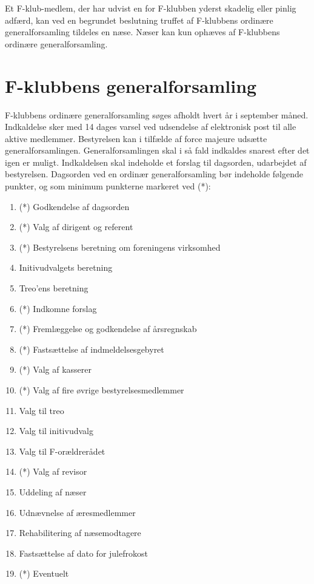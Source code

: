 \documentclass[a4paper,12pt,danish]{article}
\begin{document}
\begin{list}
\item Et F-klub-medlem, der har udvist en for F-klubben yderst
  skadelig eller pinlig adfærd, kan ved en begrundet beslutning
  truffet af F-klubbens ordinære generalforsamling tildeles en
  næse.  Næser kan kun ophæves af F-klubbens ordinære
  generalforsamling.

\section{F-klubbens generalforsamling}

\item \label{par-gen} F-klubbens ordinære generalforsamling
  søges afholdt hvert år i september måned. Indkaldelse sker med 14
  dages varsel ved udsendelse af elektronisk post til alle aktive
  medlemmer. Bestyrelsen kan i tilfælde af force majeure udsætte 
  generalforsamlingen. Generalforsamlingen skal i så fald indkaldes 
  snarest efter det igen er muligt. Indkaldelsen skal indeholde et forslag til
  dagsorden, udarbejdet af bestyrelsen. Dagsorden ved en ordinær
  generalforsamling bør indeholde følgende punkter, og som minimum
punkterne markeret ved (*):

\begin{enumerate}
\item (*) Godkendelse af dagsorden
\item (*) Valg af dirigent og referent
\item (*) Bestyrelsens beretning om foreningens virksomhed
\item Initivudvalgets beretning
\item Treo'ens beretning
\item (*) Indkomne forslag
\item (*) Fremlæggelse og godkendelse af årsregnskab
\item (*) Fastsættelse af indmeldelsesgebyret
\item (*) Valg af kasserer
\item (*) Valg af fire øvrige bestyrelsesmedlemmer
\item Valg til treo
\item Valg til initivudvalg
\item Valg til F-orældrerådet
\item (*) Valg af revisor
\item Uddeling af næser
\item Udnævnelse af æresmedlemmer
\item Rehabilitering af næsemodtagere
\item Fastsættelse af dato for julefrokost
\item (*) Eventuelt
\end{enumerate}


\end{list}
\end{document}
